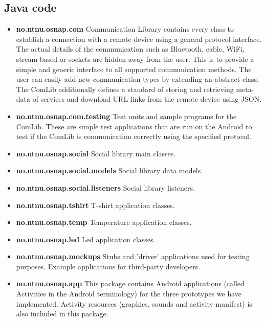 \subsection{Java code}
\begin{itemize}
	\item \textbf{no.ntnu.osnap.com}\newline
		Communication Library contains every class to establish a connection with a remote device using a general
		protocol interface. The actual details of the communication such as Bluetooth, cable, WiFi, stream-based or
		sockets are hidden away from the user. This is to provide a simple and generic interface to all supported
		communication methods. The user can easily add new communication types by extending an abstract class.
		The ComLib additionally defines a standard of storing and retrieving meta-data of services and download URL
		links from the remote device using JSON.
	\item \textbf{no.ntnu.osnap.com.testing}\newline
		Test units and sample programs for the ComLib. These are simple test applications that are run on
		the Android to test if the ComLib is communication correctly using the specified
		protocol.
	\item \textbf{no.ntnu.osnap.social}\newline
		Social library main classes.
	\item \textbf{no.ntnu.osnap.social.models}\newline
		Social library data models.
	\item \textbf{no.ntnu.osnap.social.listeners}\newline
		Social library listeners.
	\item \textbf{no.ntnu.osnap.tshirt}\newline
		T-shirt application classes.
	\item \textbf{no.ntnu.osnap.temp}\newline
		Temperature application classes.
	\item \textbf{no.ntnu.osnap.led}\newline
		Led application classes.
	\item \textbf{no.ntnu.osnap.mockups}  \newline \label{section:mockup}
		Stubs and 'driver' applications used for testing purposes.
		Example applications for third-party developers.
	\item \textbf{no.ntnu.osnap.app} \newline
		This package contains Android applications (called Activities in the Android terminology) for the three prototypes
		we have implemented. Activity resources (graphics, sounds and activity manifest) is also included in this package.
\end{itemize}

